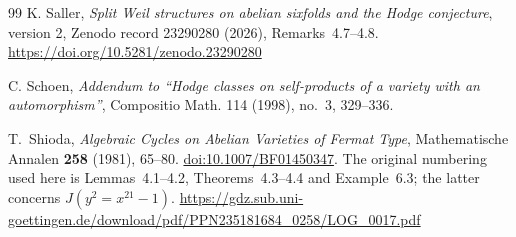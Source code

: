 \begin{thebibliography}{99}
K. Saller,
\emph{Split Weil structures on abelian sixfolds and the Hodge conjecture},
version 2, Zenodo record 23290280 (2026), Remarks~4.7--4.8.
\url{https://doi.org/10.5281/zenodo.23290280}

C. Schoen,
\emph{Addendum to ``Hodge classes on self-products of a variety with an automorphism''},
Compositio Math. 114 (1998), no.~3, 329--336.

T.~Shioda, \emph{Algebraic Cycles on Abelian Varieties of Fermat Type},
Mathematische Annalen \textbf{258} (1981), 65--80.
\href{https://doi.org/10.1007/BF01450347}{doi:10.1007/BF01450347}.
The original numbering used here is Lemmas~4.1--4.2, Theorems~4.3--4.4 and
Example~6.3; the latter concerns $J(y^2=x^{21}-1)$.
\url{https://gdz.sub.uni-goettingen.de/download/pdf/PPN235181684_0258/LOG_0017.pdf}

\end{thebibliography}
